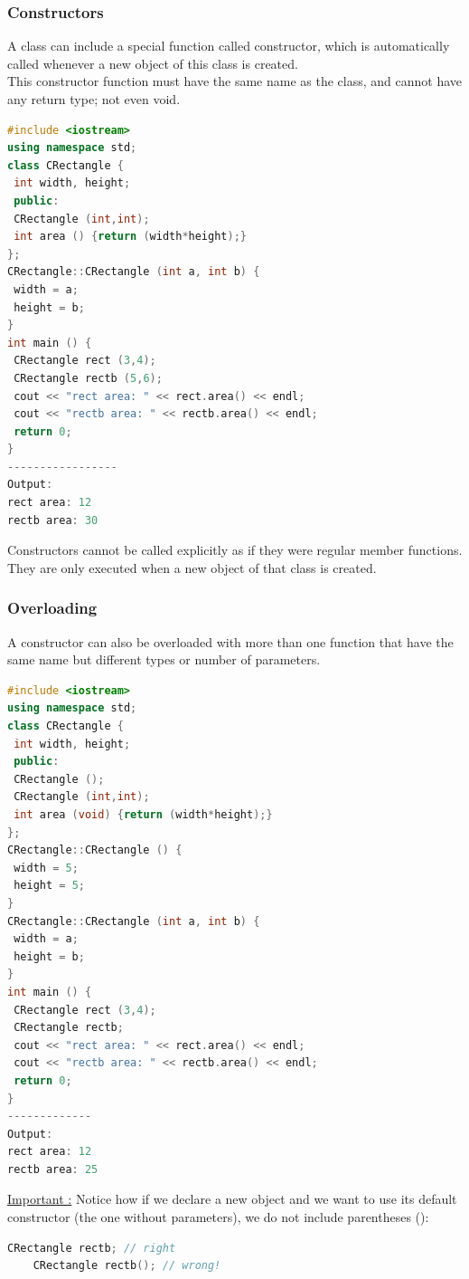 \documentclass[12pt,oneside]{book}
\begin{document}
\subsubsection{Constructors}
A class can include a special function called constructor, which is automatically called whenever a new object of this class is created.\\
This constructor function must have the same name as the class, and cannot have any return type; not even void.
	\begin{lstlisting}[language=C++]
#include <iostream>
using namespace std; 
class CRectangle { 
 int width, height; 
 public: 
 CRectangle (int,int); 
 int area () {return (width*height);} 
}; 
CRectangle::CRectangle (int a, int b) { 
 width = a; 
 height = b; 
} 
int main () { 
 CRectangle rect (3,4); 
 CRectangle rectb (5,6); 
 cout << "rect area: " << rect.area() << endl; 
 cout << "rectb area: " << rectb.area() << endl; 
 return 0; 
} 
-----------------
Output:
rect area: 12 
rectb area: 30 
\end{lstlisting}
Constructors cannot be called explicitly as if they were regular member functions. They are only executed when a new object of that class is created.
\subsubsection{Overloading}
A constructor can also be overloaded with more than one function that have the same name but different types or number of parameters.
	\begin{lstlisting}[language=C++]
#include <iostream>
using namespace std; 
class CRectangle { 
 int width, height; 
 public: 
 CRectangle (); 
 CRectangle (int,int); 
 int area (void) {return (width*height);} 
}; 
CRectangle::CRectangle () { 
 width = 5; 
 height = 5; 
} 
CRectangle::CRectangle (int a, int b) { 
 width = a; 
 height = b; 
} 
int main () { 
 CRectangle rect (3,4); 
 CRectangle rectb; 
 cout << "rect area: " << rect.area() << endl; 
 cout << "rectb area: " << rectb.area() << endl; 
 return 0; 
}
-------------
Output:
rect area: 12 
rectb area: 25 
\end{lstlisting}
\underline{Important :} Notice how if we declare a new object and we want to use its default constructor (the one without parameters), we do not include parentheses ():
\begin{lstlisting}[language=C++]
    CRectangle rectb; // right
    CRectangle rectb(); // wrong!
\end{lstlisting}
\end{document}
